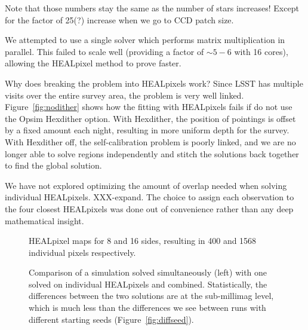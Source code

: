 \documentclass[12pt,preprint]{aastex}
\begin{document}
Note that those numbers stay the same as the number of stars increases!  Except for the factor of 25(?) increase when we go to CCD patch size.


We attempted to use a single solver which performs matrix multiplication in parallel.  This failed to scale well (providing a factor of $\sim5-6$ with 16 cores), allowing the HEALpixel method to prove faster.

Why does breaking the problem into HEALpixels work?  Since LSST has multiple visits over the entire survey area, the problem is very well linked.  Figure~\ref{fig:nodither} shows how the fitting with HEALpixels fails if do not use the Opsim Hexdither option.  With Hexdither, the position of pointings is offset by a fixed amount each night, resulting in more uniform depth for the survey.  With Hexdither off, the self-calibration problem is poorly linked, and we are no longer able to solve regions independently and stitch the solutions back together to find the global solution.  

We have not explored optimizing the amount of overlap needed when solving individual HEALpixels.  XXX-expand.  The choice to assign each observation to the four closest HEALpixels was done out of convenience rather than any deep mathematical insight.  


\begin{figure}
\caption{HEALpixel maps for 8 and 16 sides, resulting in 400 and 1568 individual pixels respectively.}
\end{figure}


\begin{figure}
\caption{Comparison of a simulation solved simultaneously (left) with one solved on individual HEALpixels and combined.  Statistically, the differences between the two solutions are at the sub-millimag level, which is much less than the differences we see between runs with different starting seeds (Figure~\ref{fig:diffseed}). \label{fig:hpvglobal}}
\end{figure}
\end{document}
